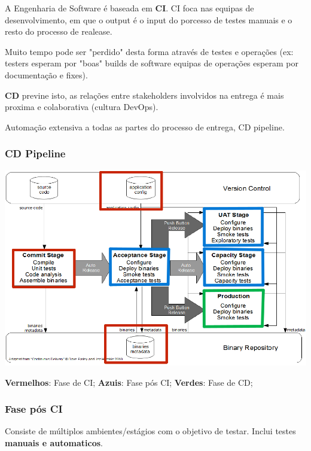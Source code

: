 \documentclass{article}
\begin{document}
A Engenharia de Software é baseada em \textbf{CI}. CI
foca nas equipas de desenvolvimento, em que o output é o
input do porcesso de testes manuais e o resto do processo
de realease.

Muito tempo pode ser "perdido" desta forma através de testes
e operações (ex: testers esperam por "boas" builds de software
equipas de operações esperam por documentação e fixes).

\vspace{2mm}

\textbf{CD} previne isto, as relações entre stakeholders
involvidos na entrega é mais proxima e colaborativa (cultura DevOps).

Automação extensiva a todas as partes do processo de entrega,
CD pipeline.

\subsubsection{CD Pipeline}

\begin{center}
  \includegraphics[scale=0.55]{41}
\end{center}

\begin{center}
  \textbf{Vermelhos}: Fase de CI;
  \textbf{Azuis}: Fase pós CI;
  \textbf{Verdes}: Fase de CD;
\end{center}

\pagebreak

\subsubsection*{Fase pós CI}

Consiste de múltiplos ambientes/estágios com o objetivo de testar.
Inclui testes \textbf{manuais e automaticos}.
\end{document}
